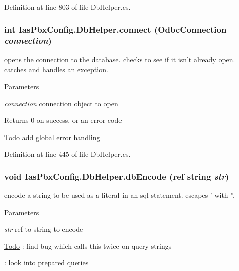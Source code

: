 Definition at line 803 of file DbHelper.cs.\hypertarget{class_ias_pbx_config_1_1_db_helper_a447599403ee4d744b04b98b1642a80ed}{
\subsubsection[{connect}]{\setlength{\rightskip}{0pt plus 5cm}int IasPbxConfig.DbHelper.connect (OdbcConnection {\em connection})}}
\label{class_ias_pbx_config_1_1_db_helper_a447599403ee4d744b04b98b1642a80ed}


opens the connection to the database. checks to see if it isn't already open. catches and handles an exception. 
\begin{DoxyParams}{Parameters}
\item[{\em connection}]connection object to open \end{DoxyParams}
\begin{DoxyReturn}{Returns}
0 on success, or an error code 
\end{DoxyReturn}
\begin{Desc}
\item[\hyperlink{todo__todo000017}{Todo}]add global error handling \end{Desc}


Definition at line 445 of file DbHelper.cs.\hypertarget{class_ias_pbx_config_1_1_db_helper_aad194ee869204b99082e7779888addd1}{
\subsubsection[{dbEncode}]{\setlength{\rightskip}{0pt plus 5cm}void IasPbxConfig.DbHelper.dbEncode (ref string {\em str})}}
\label{class_ias_pbx_config_1_1_db_helper_aad194ee869204b99082e7779888addd1}


encode a string to be used as a literal in an sql statement. escapes ' with ''. 
\begin{DoxyParams}{Parameters}
\item[{\em str}]ref to string to encode \end{DoxyParams}
\begin{Desc}
\item[\hyperlink{todo__todo000013}{Todo}]: find bug which calls this twice on query strings 

: look into prepared queries \end{Desc}


